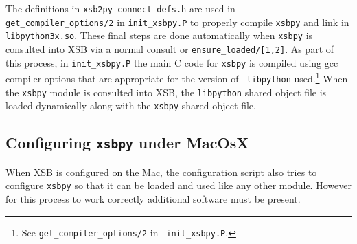 The definitions in {\tt xsb2py\_connect\_defs.h} are used in {\tt
  get\_compiler\_options/2} in {\tt init\_xsbpy.P} to properly compile
{\tt xsbpy} and link in {\tt libpython3x.so}.  These final steps are
done automatically when {\tt xsbpy} is consulted into XSB via a normal
consult or {\tt ensure\_loaded/[1,2]}.  As part of this process, in
{\tt init\_xsbpy.P} the main C code for {\tt xsbpy} is compiled using
gcc compiler options that are appropriate for the version of {\tt
  libpython} used.\footnote{See {\tt get\_compiler\_options/2} in {\tt
    init\_xsbpy.P}.}  When the {\tt xsbpy} module is consulted into
XSB, the {\tt libpython} shared object file is loaded dynamically
along with the {\tt xsbpy} shared object file.

%
%


\noindent

\subsection{Configuring {\tt xsbpy} under MacOsX}

When XSB is configured on the Mac, the configuration script also tries
to configure {\tt xsbpy} so that it can be loaded and used like any
other module.  However for this process to work correctly additional
software must be present.

